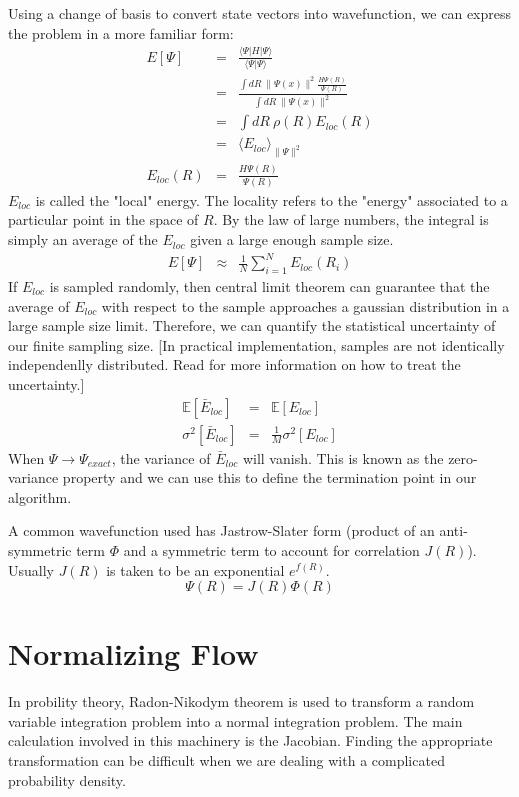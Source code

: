 \documentclass[12pt,a4paper]{article}
\begin{document}
Using a change of basis to convert state vectors into wavefunction, we can express the
problem in a more familiar form:
\begin{eqnarray*}
E[\Psi] &=& \frac{\langle \Psi | H|\Psi \rangle}{\langle \Psi | \Psi \rangle}\\
        &=& \frac{\int dR\ \|\Psi(x)\|^2 \frac{H\Psi(R)}{\Psi(R)}}{\int dR\  \|\Psi(x)\|^2}\\
        &=& \int dR\ \rho(R) E_{loc}(R)\\
        &=& \bigg\langle E_{loc} \bigg\rangle_{\|\Psi\|^2}\\
E_{loc}(R) &=& \frac{H\Psi(R)}{\Psi(R)}
\end{eqnarray*}
$E_{loc}$ is called the "local" energy. The locality refers to the "energy" associated to a particular point in the space of $R$. By the law of large numbers, the integral is simply an average of the $E_{loc}$ given a large enough sample size.
\begin{eqnarray*}
E[\Psi] &\approx& \frac{1}{N} \sum_{i=1}^{N} E_{loc}(R_i)
\end{eqnarray*}
If $E_{loc}$ is sampled randomly, then central limit theorem can guarantee that the average of $E_{loc}$ with respect to the sample approaches a gaussian distribution in a large sample size limit.
Therefore, we can quantify the statistical uncertainty of our finite sampling size. [In practical implementation, samples are not identically independenlly distributed. Read \cite{TOULOUSE2016285} for more information on how to treat the uncertainty.]
\begin{eqnarray*}
\mathbb{E}[\bar{E}_{loc}] &=& \mathbb{E}[E_{loc}]\\
\sigma^2[\bar{E}_{loc}] &=& \frac{1}{M}\sigma^2[E_{loc}]
\end{eqnarray*}
When $\Psi\rightarrow\Psi_{exact}$, the variance of $\bar{E}_{loc}$ will vanish. This is known as the
zero-variance property and we can use this to define the termination point in our algorithm.

A common wavefunction used has Jastrow-Slater form (product of an anti-symmetric term $\Phi$
and a symmetric term to account for correlation $J(R)$). Usually $J(R)$ is taken to be an
exponential $e^{f(R)}$.
\begin{equation}
\Psi(R) = J(R)\Phi(R)
\end{equation}



\section{Normalizing Flow}
In probility theory, Radon-Nikodym theorem is used to transform a random variable integration problem
into a normal integration problem. The main calculation involved in this machinery is the Jacobian.
Finding the appropriate transformation can be difficult when we are dealing with a complicated probability density.
\end{document}
